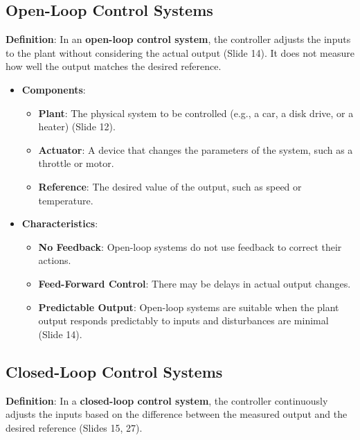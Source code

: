 \documentclass[
  14pt,
  a4paper,
  numbers=noendperiod,
  headinclude=true,
  footinclude=true,
  DIV=calc]{scrreprt}
\begin{document}
\subsection{Open-Loop Control Systems}\label{open-loop-control-systems}

\textbf{Definition}: In an \textbf{open-loop control system}, the
controller adjusts the inputs to the plant without considering the
actual output (Slide 14). It does not measure how well the output
matches the desired reference.

\begin{itemize}
\item
  \textbf{Components}:

  \begin{itemize}
  \item
    \textbf{Plant}: The physical system to be controlled (e.g., a car, a
    disk drive, or a heater) (Slide 12).
  \item
    \textbf{Actuator}: A device that changes the parameters of the
    system, such as a throttle or motor.
  \item
    \textbf{Reference}: The desired value of the output, such as speed
    or temperature.
  \end{itemize}
\item
  \textbf{Characteristics}:

  \begin{itemize}
  \item
    \textbf{No Feedback}: Open-loop systems do not use feedback to
    correct their actions.
  \item
    \textbf{Feed-Forward Control}: There may be delays in actual output
    changes.
  \item
    \textbf{Predictable Output}: Open-loop systems are suitable when the
    plant output responds predictably to inputs and disturbances are
    minimal (Slide 14).
  \end{itemize}
\end{itemize}

\subsection{Closed-Loop Control
Systems}\label{closed-loop-control-systems}

\textbf{Definition}: In a \textbf{closed-loop control system}, the
controller continuously adjusts the inputs based on the difference
between the measured output and the desired reference (Slides 15, 27).
\end{document}
